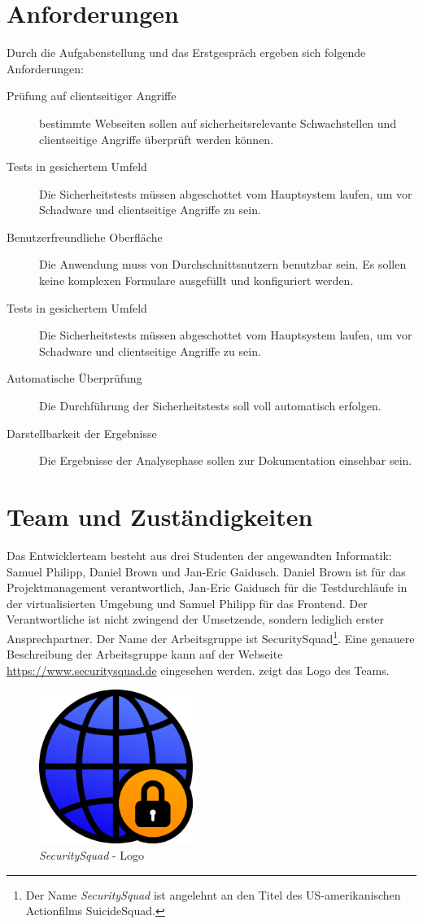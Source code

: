 \documentclass[
	pdftex,
	fontsize=12pt,          %
	DIV10,                  %
	ngerman,                %
	paper=a4,               %
	twoside=false,          %
	titlepage,              %
	parskip=half,           %
	headings=normal,        %
	listof=nochaptergap,  %
	bibliography=totoc, %
	index=totoc,            %
	captions=tableheading,  %
	final                 %
]{scrreprt}
\begin{document}
\section{Anforderungen}
Durch die Aufgabenstellung und das Erstgespräch ergeben sich folgende Anforderungen:
\begin{description}
	\item[Prüfung auf clientseitiger Angriffe]{bestimmte Webseiten sollen auf sicherheitsrelevante Schwachstellen und clientseitige Angriffe überprüft werden können.}
	\item[Tests in gesichertem Umfeld]{Die Sicherheitstests müssen abgeschottet vom Hauptsystem laufen, um vor Schadware und clientseitige Angriffe zu sein.}
	\item[Benutzerfreundliche Oberfläche]{Die Anwendung muss von Durchschnittsnutzern benutzbar sein. Es sollen keine komplexen Formulare ausgefüllt und konfiguriert werden.}
	\item[Tests in gesichertem Umfeld]{Die Sicherheitstests müssen abgeschottet vom Hauptsystem laufen, um vor Schadware und clientseitige Angriffe zu sein.}
	\item[Automatische Überprüfung]{Die Durchführung der Sicherheitstests soll voll automatisch erfolgen.}
	\item[Darstellbarkeit der Ergebnisse]{Die Ergebnisse der Analysephase sollen zur Dokumentation einsehbar sein.}
\end{description}


\section{Team und Zuständigkeiten}

Das Entwicklerteam besteht aus drei Studenten der angewandten Informatik: Samuel Philipp, Daniel Brown und Jan-Eric Gaidusch. Daniel Brown ist für das Projektmanagement verantwortlich, Jan-Eric Gaidusch für die Testdurchläufe in der virtualisierten Umgebung und Samuel Philipp für das Frontend. Der Verantwortliche ist nicht zwingend der Umsetzende, sondern lediglich erster Ansprechpartner. Der Name der Arbeitsgruppe ist SecuritySquad\footnote{Der Name \textit{SecuritySquad} ist angelehnt an den Titel des US-amerikanischen Actionfilms SuicideSquad.}. Eine genauere Beschreibung der Arbeitsgruppe kann auf der Webseite \url{https://www.securitysquad.de} eingesehen werden.  zeigt das Logo des Teams.

\begin{figure}[H]
	\centering
	\includegraphics[width=5cm]{bilder/securitysquad}
	\caption{\textit{SecuritySquad} - Logo}
	\label{fig:securitysquad-logo}
\end{figure}
\end{document}
